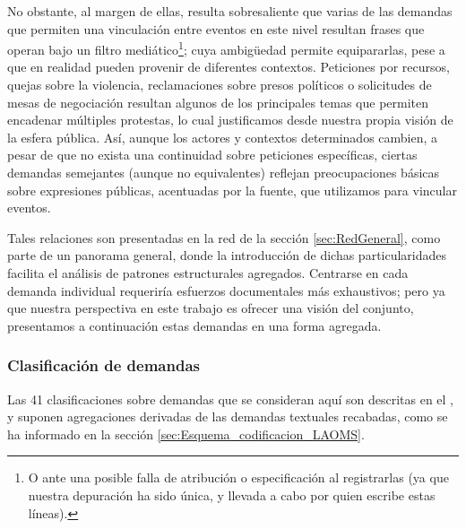 \documentclass[letterpaper, 11pt]{book}
\theoremstyle{definition}
\theoremstyle{remark}
\begin{document}
No obstante, al margen de ellas, resulta sobresaliente que varias de las demandas que permiten una vinculación entre eventos en este nivel resultan frases que operan bajo un filtro mediático\footnote{
    O ante una posible falla de atribución o especificación al registrarlas (ya que nuestra depuración ha sido única, y llevada a cabo por quien escribe estas líneas).
}; 
cuya ambigüedad permite equipararlas, pese a que en realidad pueden provenir de diferentes contextos. 
Peticiones por recursos, quejas sobre la violencia, reclamaciones sobre presos políticos o solicitudes de mesas de negociación resultan algunos de los principales temas que permiten encadenar múltiples protestas, lo cual justificamos desde nuestra propia visión de la esfera pública. 
Así, aunque los actores y contextos determinados cambien, a pesar de que no exista una continuidad sobre peticiones específicas, ciertas demandas semejantes (aunque no equivalentes) reflejan preocupaciones básicas sobre expresiones públicas, acentuadas por la fuente, que utilizamos para vincular eventos. 


Tales relaciones son presentadas en la red de la sección \ref{sec:RedGeneral}, como parte de un panorama general, donde la introducción de dichas particularidades facilita el análisis de patrones estructurales agregados. 
Centrarse en cada demanda individual requeriría esfuerzos documentales más exhaustivos; pero ya que nuestra perspectiva en este trabajo es ofrecer una visión del conjunto, presentamos a continuación estas demandas en una forma agregada. 






\subsubsection{Clasificación de demandas}
\label{subsubsec:Clasificacion_demandas}


Las 41 clasificaciones sobre demandas que se consideran aquí son descritas en el , y suponen agregaciones derivadas de las demandas textuales recabadas, como se ha informado en la sección \ref{sec:Esquema_codificacion_LAOMS}. 
\end{document}
